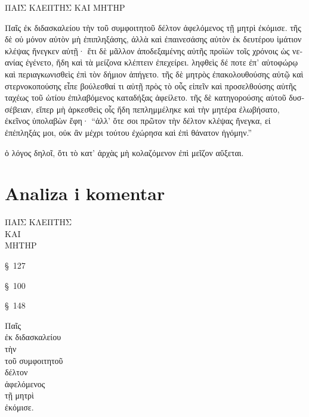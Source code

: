 \medskip

{\large
\begin{greek}
\noindent ΠΑΙΣ ΚΛΕΠΤΗΣ ΚΑΙ ΜΗΤΗΡ 

\medskip

\noindent Παῖς ἐκ διδασκαλείου τὴν τοῦ συμφοιτητοῦ δέλτον ἀφελόμενος τῇ μητρὶ ἐκόμισε. τῆς δὲ οὐ μόνον αὐτὸν μὴ ἐπιπληξάσης, ἀλλὰ καὶ ἐπαινεσάσης αὐτὸν ἐκ δευτέρου ἱμάτιον κλέψας ἤνεγκεν αὐτῇ· ἔτι δὲ μᾶλλον ἀποδεξαμένης αὐτῆς προϊὼν τοῖς χρόνοις ὡς νεανίας ἐγένετο, ἤδη καὶ τὰ μείζονα κλέπτειν  ἐπεχείρει. ληφθεὶς δέ ποτε ἐπ' αὐτοφώρῳ καὶ περιαγκωνισθεὶς ἐπὶ τὸν δήμιον ἀπήγετο. τῆς δὲ μητρὸς ἐπακολουθούσης αὐτῷ καὶ στερνοκοπούσης εἶπε βούλεσθαί τι αὐτῇ πρὸς τὸ οὖς εἰπεῖν καὶ προσελθούσης αὐτῆς ταχέως τοῦ ὠτίου ἐπιλαβόμενος καταδήξας ἀφείλετο. τῆς δὲ κατηγορούσης αὐτοῦ δυσσέβειαν, εἴπερ μὴ ἀρκεσθεὶς οἷς ἤδη πεπλημμέληκε καὶ τὴν μητέρα ἐλωβήσατο, ἐκεῖνος ὑπολαβὼν ἔφη· ``ἀλλ' ὅτε σοι πρῶτον τὴν δέλτον κλέψας ἤνεγκα, εἰ ἐπέπληξάς μοι, οὐκ ἂν μέχρι τούτου ἐχώρησα καὶ ἐπὶ θάνατον ἠγόμην.''

ὁ λόγος δηλοῖ, ὅτι τὸ κατ' ἀρχὰς μὴ κολαζόμενον ἐπὶ μεῖζον αὔξεται. 
\end{greek}

}


\section*{Analiza i komentar}


{\large
\noindent ΠΑΙΣ ΚΛΕΠΤΗΣ \\
ΚΑΙ \\
ΜΗΤΗΡ\\

}

\begin{description}[noitemsep]

\item[ΠΑΙΣ] §~127
\item[ΚΛΕΠΤΗΣ] §~100
\item[ΜΗΤΗΡ] §~148
\end{description}

{\large
\noindent Παῖς \\ 
\tabto{2em} ἐκ διδασκαλείου\\ 
τὴν \\
\tabto{2em} τοῦ συμφοιτητοῦ \\
δέλτον \\
ἀφελόμενος\\ 
\tabto{2em} τῇ μητρὶ \\
ἐκόμισε.\\

}


